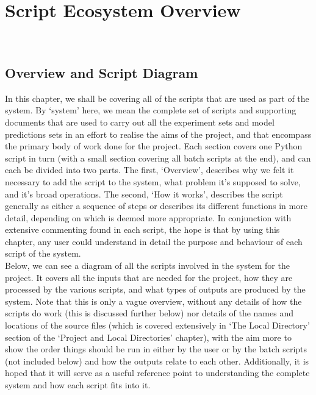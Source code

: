 \documentclass[12pt,twoside]{report}
\begin{document}
\chapter{Script Ecosystem Overview\\~\\}

\section{Overview and Script Diagram}

\quad In this chapter, we shall be covering all of the scripts that are used as part of the system. By ‘system’ here, we mean the complete set of scripts and supporting documents that are used to carry out all the experiment sets and model predictions sets in an effort to realise the aims of the project, and that encompass the primary body of work done for the project. Each section covers one Python script in turn (with a small section covering all batch scripts at the end), and can each be divided into two parts. The first, ‘Overview’, describes why we felt it necessary to add the script to the system, what problem it’s supposed to solve, and it’s broad operations. The second, ‘How it works’, describes the script generally as either a sequence of steps or describes its different functions in more detail, depending on which is deemed more appropriate. In conjunction with extensive commenting found in each script, the hope is that by using this chapter, any user could understand in detail the purpose and behaviour of each script of the system.\\

\quad Below, we can see a diagram of all the scripts involved in the system for the project. It covers all the inputs that are needed for the project, how they are processed by the various scripts, and what types of outputs are produced by the system. Note that this is only a vague overview, without any details of how the scripts do work (this is discussed further below) nor details of the names and locations of the source files (which is covered extensively in ‘The Local Directory’ section of the ‘Project and Local Directories’ chapter), with the aim more to show the order things should be run in either by the user or by the batch scripts (not included below) and how the outputs relate to each other. Additionally, it is hoped that it will serve as a useful reference point to understanding the complete system and how each script fits into it.
\end{document}
